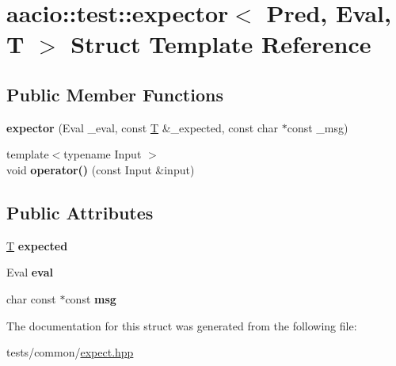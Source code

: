 \hypertarget{structaacio_1_1test_1_1expector}{}\section{aacio\+:\+:test\+:\+:expector$<$ Pred, Eval, T $>$ Struct Template Reference}
\label{structaacio_1_1test_1_1expector}
\subsection*{Public Member Functions}
\begin{DoxyCompactItemize}
\item 
\mbox{\label{structaacio_1_1test_1_1expector_ad531e69dd285c71a024c45d21709d29d}} 
{\bfseries expector} (Eval \+\_\+eval, const \mbox{\hyperlink{struct_t}{T}} \&\+\_\+expected, const char $\ast$const \+\_\+msg)
\item 
\mbox{\label{structaacio_1_1test_1_1expector_ac01bfa6ee1da6217b2a9c52923ef3a41}} 
{\footnotesize template$<$typename Input $>$ }\\void {\bfseries operator()} (const Input \&input)
\end{DoxyCompactItemize}
\subsection*{Public Attributes}
\begin{DoxyCompactItemize}
\item 
\mbox{\label{structaacio_1_1test_1_1expector_ad7738c4f6a7e9c2bb261855424b35118}} 
\mbox{\hyperlink{struct_t}{T}} {\bfseries expected}
\item 
\mbox{\label{structaacio_1_1test_1_1expector_a7161e5cbad84dda6b612700d52e66d4e}} 
Eval {\bfseries eval}
\item 
\mbox{\label{structaacio_1_1test_1_1expector_ab8bf1ce3e0b96bdd4a2557eea72f74c5}} 
char const  $\ast$const {\bfseries msg}
\end{DoxyCompactItemize}


The documentation for this struct was generated from the following file\+:\begin{DoxyCompactItemize}
\item 
tests/common/\mbox{\hyperlink{expect_8hpp}{expect.\+hpp}}\end{DoxyCompactItemize}

